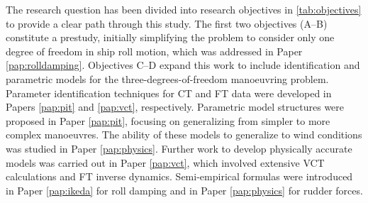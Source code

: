 \noindent The research question has been divided into research objectives in \autoref{tab:objectives} to provide a clear path through this study. The first two objectives (A--B) constitute a prestudy, initially simplifying the problem to consider only one degree of freedom in ship roll motion, which was addressed in Paper \ref{pap:rolldamping}. Objectives C--D expand this work to include identification and parametric models for the three-degrees-of-freedom manoeuvring problem. Parameter identification techniques for CT and FT data were developed in Papers \ref{pap:pit} and \ref{pap:vct}, respectively. Parametric model structures were proposed in Paper \ref{pap:pit}, focusing on generalizing from simpler to more complex manoeuvres. The ability of these models to generalize to wind conditions was studied in Paper \ref{pap:physics}. Further work to develop physically accurate models was carried out in Paper \ref{pap:vct}, which involved extensive VCT calculations and FT inverse dynamics. Semi-empirical formulas were introduced in Paper \ref{pap:ikeda} for roll damping and in Paper \ref{pap:physics} for rudder forces. 
%
%
%    
%    
%
%
%    
